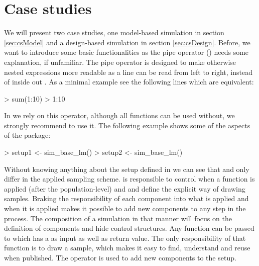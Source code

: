 \documentclass[article]{ajs}
\begin{document}
\section{Case studies}
\label{sec:caseStudy}
We will present two case studies, one model-based simulation in section \ref{sec:csModel} and a design-based simulation in section \ref{sec:csDesign}. Before, we want to introduce some basic functionalities as the pipe operator (\proglang{\%>\%}) needs some explanation, if unfamiliar. The pipe operator is designed to make otherwise nested expressions more readable as a line can be read from left to right, instead of inside out \citep{bache14}. As a minimal example see the following lines which are equivalent:

\begin{Schunk}
\begin{Sinput}
> sum(1:10)
> 1:10 %
\end{Sinput}
\end{Schunk}

In  we rely on this operator, although all functions can be used without, we strongly recommend to use it. The following example shows some of the aspects of the package:

\begin{Schunk}
\begin{Sinput}
> setup1 <- sim_base_lm() %
> setup2 <- sim_base_lm() %
\end{Sinput}
\end{Schunk}

Without knowing anything about the setup defined in  we can see that  and  only differ in the applied sampling scheme.  is responsible to control when a function is applied (after the population-level) and  and  define the explicit way of drawing samples. Braking the responsibility of each component into what is applied and when it is applied makes it possible to add new components to any step in the process. The composition of a simulation in that manner will focus on the definition of components and hide control structures. Any function can be passed to  which has a  as input as well as return value. The only responsibility of that function is to draw a sample, which makes it easy to find, understand and reuse when published. The operator \proglang{\%>\%} is used to add new components to the setup. 
\end{document}

